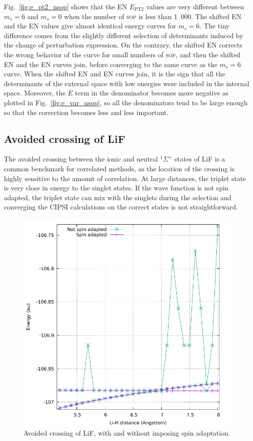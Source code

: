 \documentclass[aip,jcp,reprint,showkeys]{revtex4-1}
\newcommand{\sop}{\textsc{sop}}
\newcommand{\ept}{E_\text{PT2}}
\begin{document}
Fig.~\ref{fig:e_pt2_nsop} shows that the EN $\ept$ values are very different
between $m_s=6$ and $m_s=0$ when the number of \sop{} is less than 1~000. The
shifted EN and the EN values give almost identical energy curves for $m_s=6$.
The tiny difference comes from the slightly different selection of determinants
induced by the change of perturbation expression. On the contrary, the shifted EN
corrects the wrong behavior of the curve for small numbers of \sop{}, and then
the shifted EN and the EN curves join, before converging to the same curve as
the $m_s=6$ curve. When the shifted EN and EN curves join, it is the sign
that all the determinants of the external space with low energies were included
in the internal space. Moreover, the $E$ term in the denominator becomes more
negative as plotted in Fig.~\ref{fig:e_var_nsop}, so all the denominators tend to be large enough so that the correction becomes less and less important.


\subsection{Avoided crossing of LiF}

The avoided crossing between the ionic and neutral $^1\Sigma^+$ states of LiF is a 
common benchmark for correlated methods, as the location of the crossing is highly
sensitive to the amount of correlation. At large distances, the triplet state
is very close in energy to the singlet states. If the wave function is not
spin adapted, the triplet state can mix with the singlets during the selection
and converging the CIPSI calculations on the correct states is not straightforward.

\begin{figure}
\includegraphics[width=0.9\columnwidth]{lif}
\caption{Avoided crossing of LiF, with and without imposing spin adaptation.}
\label{fig:lif}
\end{figure}
\end{document}
